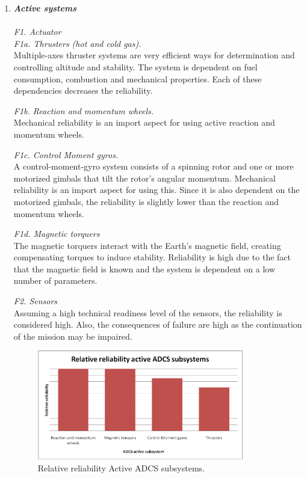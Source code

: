\begin{enumerate}[A]
	\item  \textbf{\textit{Active systems}} \\\\
\textit{F1. Actuator}\\

\textit{F1a. Thrusters (hot and cold gas).}\\ 
Multiple-axes thruster systems are very efficient ways for determination and controlling altitude and stability. The system is dependent on fuel consumption, combustion and mechanical properties. Each of these dependencies decreases the reliability. 

\textit{F1b. Reaction and momentum wheels.}\\ 
Mechanical reliability is an import aspect for using active reaction and momentum wheels. 

\textit{F1c. Control Moment gyros.}\\ 
A control-moment-gyro system consists of a spinning rotor and one or more motorized gimbals that tilt the rotor's angular momentum. Mechanical reliability is an import aspect for using this. Since it is also dependent on the motorized gimbals, the reliability is slightly lower than the reaction and momentum wheels.

\textit{F1d. Magnetic torquers}\\ 
The magnetic torquers interact with the Earth's magnetic field, creating compensating torques to induce stability. Reliability is high due to the fact that the magnetic field is known and the system is dependent on a low number of parameters.

\textit{F2. Sensors}\\ 
Assuming a high technical readiness level of the sensors, the reliability is considered high. Also, the consequences of failure are high as the continuation of the mission may be impaired.

\begin{figure} [h]
	\begin{center}
 \includegraphics[width=0.85\textwidth,angle=0]{chapters/img/TRA_ADCS_A.png}	
	\caption{Relative reliability Active ADCS subsystems.}
	\label{TRA_ADCS_A}
	\end{center}
\end{figure}


\end{enumerate}

